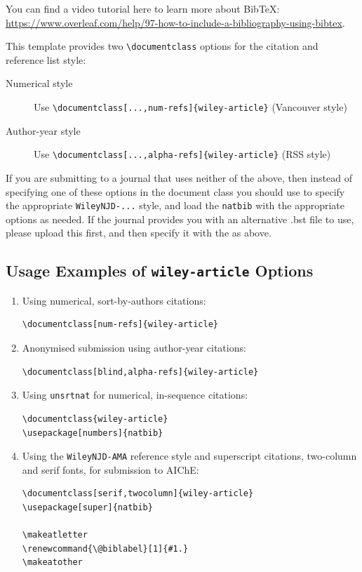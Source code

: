 \documentclass[num-refs]{wiley-article}
\begin{document}
You can find a video tutorial here to learn more about BibTeX: \url{https://www.overleaf.com/help/97-how-to-include-a-bibliography-using-bibtex}.

This template provides two \verb|\documentclass| options for the citation and reference list style: 
\begin{description}
\item[Numerical style] Use \verb|\documentclass[...,num-refs]{wiley-article}| (Vancouver style)
\item[Author-year style] Use \verb|\documentclass[...,alpha-refs]{wiley-article}| (RSS style)
\end{description}

If you are submitting to a journal that uses neither of the above, then instead of specifying one of these options in the document class you should use  \verb|| to specify the appropriate \verb|WileyNJD-...| style, and load the \verb|natbib| with the appropriate options as needed. If the journal provides you with an alternative .bst file to use, please upload this first, and then specify it with the \verb|| as above.

\subsection{Usage Examples of \texttt{wiley-article} Options}

\begin{enumerate}
\item Using numerical, sort-by-authors citations:
\begin{verbatim}
\documentclass[num-refs]{wiley-article}
\end{verbatim}

\item Anonymised submission using author-year citations:
\begin{verbatim}
\documentclass[blind,alpha-refs]{wiley-article}
\end{verbatim}

\item Using \texttt{unsrtnat} for numerical, in-sequence citations:
\begin{verbatim}
\documentclass{wiley-article}
\usepackage[numbers]{natbib}

\end{verbatim}

\item Using the \texttt{WileyNJD-AMA} reference style and superscript citations, two-column and serif fonts, for submission to AIChE:

\begin{verbatim}
\documentclass[serif,twocolumn]{wiley-article}
\usepackage[super]{natbib}

\makeatletter
\renewcommand{\@biblabel}[1]{#1.}
\makeatother
\end{verbatim}

\end{enumerate}
\end{document}
